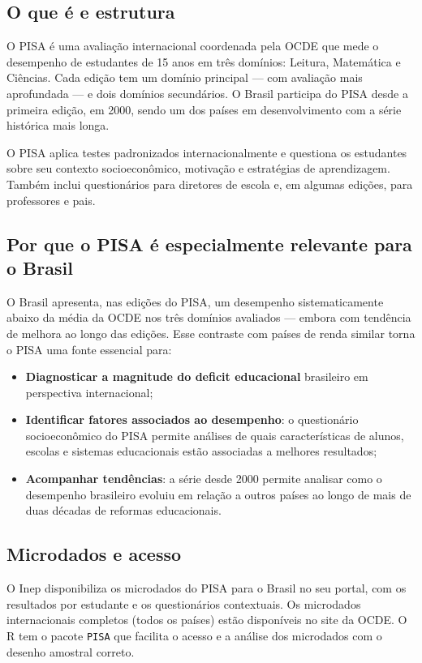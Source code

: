 \subsection{O que é e estrutura}

O PISA é uma avaliação internacional coordenada pela OCDE que mede o desempenho de estudantes de 15 anos em três domínios: Leitura, Matemática e Ciências. Cada edição tem um domínio principal --- com avaliação mais aprofundada --- e dois domínios secundários. O Brasil participa do PISA desde a primeira edição, em 2000, sendo um dos países em desenvolvimento com a série histórica mais longa.

O PISA aplica testes padronizados internacionalmente e questiona os estudantes sobre seu contexto socioeconômico, motivação e estratégias de aprendizagem. Também inclui questionários para diretores de escola e, em algumas edições, para professores e pais.

\subsection{Por que o PISA é especialmente relevante para o Brasil}

O Brasil apresenta, nas edições do PISA, um desempenho sistematicamente abaixo da média da OCDE nos três domínios avaliados --- embora com tendência de melhora ao longo das edições. Esse contraste com países de renda similar torna o PISA uma fonte essencial para:

\begin{itemize}
  \item \textbf{Diagnosticar a magnitude do deficit educacional} brasileiro em perspectiva internacional;
  \item \textbf{Identificar fatores associados ao desempenho}: o questionário socioeconômico do PISA permite análises de quais características de alunos, escolas e sistemas educacionais estão associadas a melhores resultados;
  \item \textbf{Acompanhar tendências}: a série desde 2000 permite analisar como o desempenho brasileiro evoluiu em relação a outros países ao longo de mais de duas décadas de reformas educacionais.
\end{itemize}

\subsection{Microdados e acesso}

O Inep disponibiliza os microdados do PISA para o Brasil no seu portal, com os resultados por estudante e os questionários contextuais. Os microdados internacionais completos (todos os países) estão disponíveis no site da OCDE. O R tem o pacote \texttt{PISA} que facilita o acesso e a análise dos microdados com o desenho amostral correto.

